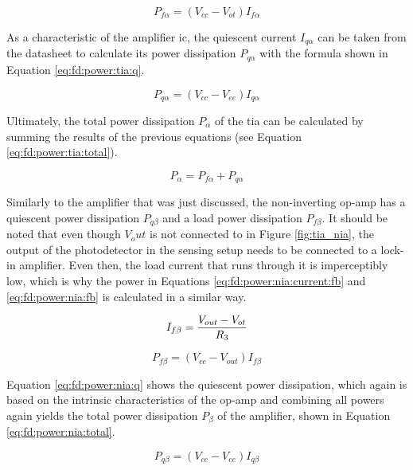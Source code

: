 \begin{equation}\label{eq:fd:power:tia:fb}
	P_{f\alpha} = (V_{cc} - V_{ot})I_{f\alpha}
\end{equation}


As a characteristic of the amplifier \gls{ic}, the quiescent current $I_{q\alpha}$ can be taken from the datasheet to calculate its power dissipation $P_{q\alpha}$ with the formula shown in Equation \eqref{eq:fd:power:tia:q}.

\begin{equation}\label{eq:fd:power:tia:q}
	P_{q\alpha} = (V_{cc} - V_{ee})I_{q\alpha}
\end{equation}

Ultimately, the total power dissipation $P_{\alpha}$ of the \gls{tia} can be calculated by summing the results of the previous equations (see Equation \eqref{eq:fd:power:tia:total}).

\begin{equation}\label{eq:fd:power:tia:total}
	P_{\alpha} = P_{f\alpha} + P_{q\alpha}
\end{equation}

Similarly to the amplifier that was just discussed, the non-inverting op-amp has a quiescent power dissipation $P_{q\beta}$ and a load power dissipation $P_{f\beta}$. It should be noted that even though $V_out$ is not connected to in Figure \ref{fig:tia_nia}, the output of the photodetector in the sensing setup needs to be connected to a lock-in amplifier. Even then, the load current that runs through it is imperceptibly low, which is why the power in Equations \eqref{eq:fd:power:nia:current:fb} and \eqref{eq:fd:power:nia:fb} is calculated in a similar way. 

\begin{equation}\label{eq:fd:power:nia:current:fb}
		I_{f\beta} = \frac{V_{out} - V_{ot}}{R_3}\\
\end{equation}

\begin{equation}\label{eq:fd:power:nia:fb}
	P_{f\beta} = (V_{cc} - V_{out})I_{f\beta}
\end{equation}


Equation \eqref{eq:fd:power:nia:q} shows the quiescent power dissipation, which again is based on the intrinsic characteristics of the op-amp and combining all powers again yields the total power dissipation $P_\beta$ of the amplifier, shown in Equation \eqref{eq:fd:power:nia:total}.

\begin{equation}\label{eq:fd:power:nia:q}
	P_{q\beta} = (V_{cc} - V_{ee})I_{q\beta}
\end{equation}


